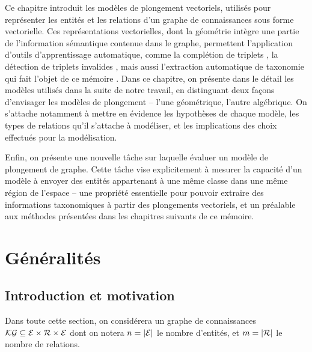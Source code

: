 \label{chap:kge}

Ce chapitre introduit les modèles de plongement vectoriels, utilisés pour représenter les entités et les relations d'un graphe de connaissances sous forme vectorielle. Ces représentations vectorielles, dont la géométrie intègre une partie de l'information sémantique contenue dans le graphe, permettent l'application d'outils d'apprentissage automatique, comme la complétion de triplets \cite{simple2018}, la détection de triplets invalides \cite{nguyen2020relational}, mais aussi l'extraction automatique de taxonomie qui fait l'objet de ce mémoire \cite{ristoski2017large, zhang2018taxogen}. Dans ce chapitre, on présente dans le détail les modèles utilisés dans la suite de notre travail, en distinguant deux façons d'envisager les modèles de plongement – l'une géométrique, l'autre algébrique. On s'attache notamment à mettre en évidence les hypothèses de chaque modèle, les types de relations qu'il s'attache à modéliser, et les implications des choix effectués pour la modélisation. %

Enfin, on présente une nouvelle tâche sur laquelle évaluer un modèle de plongement de graphe. Cette tâche vise explicitement à mesurer la capacité d'un modèle à envoyer des entités appartenant à une même classe dans une même région de l'espace – une propriété essentielle pour pouvoir extraire des informations taxonomiques à partir des plongements vectoriels, et un préalable aux méthodes présentées dans les chapitres suivants de ce mémoire.


\section{Généralités}
\label{sec:kge-general}


\subsection{Introduction et motivation}
\label{subsec:kge-general-intro}



Dans toute cette section, on considérera un graphe de connaissances $\mathcal{KG} \subseteq \mathcal{E} \times \mathcal{R} \times \mathcal{E}$ dont on notera $n = | \mathcal{E} |$ le nombre d'entités, et $m = |\mathcal{R} |$ le nombre de relations.


